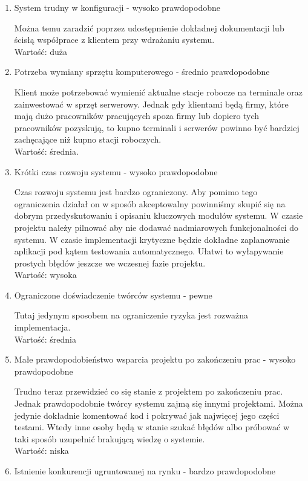\documentclass[12pt]{article}
\begin{document}
\begin{enumerate}
	\item System trudny w konfiguracji - wysoko prawdopodobne

	      Można temu zaradzić poprzez udostępnienie dokładnej dokumentacji lub ścisłą współprace z klientem przy wdrażaniu systemu. \\
	      Wartość: duża
	\item Potrzeba wymiany sprzętu komputerowego - średnio prawdopodobne

	      Klient może potrzebować wymienić aktualne stacje robocze na terminale oraz zainwestować w sprzęt serwerowy. Jednak gdy klientami będą firmy, które mają dużo pracowników pracujących spoza firmy lub dopiero tych pracowników pozyskują, to kupno terminali i serwerów powinno być bardziej zachęcające niż kupno stacji roboczych.\\
	      Wartość: średnia.
	\item Krótki czas rozwoju systemu - wysoko prawdopodobne

	      Czas rozwoju systemu jest bardzo ograniczony. Aby pomimo tego ograniczenia działał on w sposób akceptowalny powinniśmy skupić się na dobrym przedyskutowaniu i opisaniu kluczowych modułów systemu. W czasie projektu należy pilnować aby nie dodawać nadmiarowych funkcjonalności do systemu. W czasie implementacji krytyczne będzie dokładne zaplanowanie aplikacji pod kątem testowania automatycznego. Ułatwi to wyłapywanie prostych błędów jeszcze we wczesnej fazie projektu.\\
	      Wartość: wysoka
   	\newpage
	\item Ograniczone doświadczenie twórców systemu - pewne

	      Tutaj jedynym sposobem na ograniczenie ryzyka jest rozważna implementacja.\\
	      Wartość: średnia
	\item Małe prawdopodobieństwo wsparcia projektu po zakończeniu prac - wysoko prawdopodobne

	      Trudno teraz przewidzieć co się stanie z projektem po zakończeniu prac. Jednak prawdopodobnie twórcy systemu zajmą się innymi projektami. Można jedynie dokładnie komentować kod i pokrywać jak najwięcej jego części testami. Wtedy inne osoby będą w stanie szukać błędów albo próbować w taki sposób uzupełnić brakującą wiedzę o systemie.\\
	      Wartość: niska
	\item Istnienie konkurencji ugruntowanej na rynku - bardzo prawdopodobne


\end{enumerate}
\end{document}
